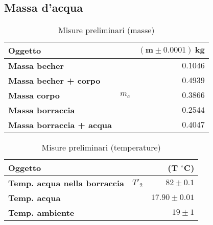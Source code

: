 \documentclass{article}
\begin{document}
	\subsection{Massa d'acqua}
	\begin{minipage}{0.4\textwidth}
		\begin{table}[H] \centering
			\begin{small}
				\begin{tabular}{@{}lrr@{}}\toprule
					\textbf{Oggetto}&  & \(\boldsymbol{(m \pm 0.0001) \SI{}{\kilogram}}\) \\ \midrule
					\textbf{Massa becher}	&	 & \(0.1046\)   \\  \hdashline
					\textbf{Massa becher + corpo}	& 	 & \(0.4939\)   \\  \hdashline
					\textbf{Massa corpo}	& \(m_{c}\)	 & \(0.3866\)   \\  \hdashline
					\textbf{Massa borraccia}	&	 & \(0.2544\)   \\\hdashline
					\textbf{Massa borraccia + acqua}	&	 & \(0.4047\)   \\  
					\bottomrule
				\end{tabular}
			\end{small}
			\caption{Misure preliminari (masse)}
		\end{table}
	\end{minipage}
	\begin{minipage}{0.6\textwidth}
		\begin{table}[H] \centering
			\begin{small}
				\begin{tabular}{@{}lrr@{}}\toprule
					\textbf{Oggetto}					&  			& \textbf{(\(\boldsymbol{T}\)} \(\boldsymbol{^\circ C}\))\\ \midrule
					\textbf{Temp. acqua nella borraccia}	& 	\(T'_{2}\)		& \(82 \pm 0.1\)	 \\  \hdashline
					\textbf{Temp. acqua}				&					&\(17.90 \pm 0.01\)		 	 \\  \hdashline
					\textbf{Temp. ambiente}				&					& \(19 \pm 1\)		 	  \\  
					\bottomrule
				\end{tabular}
			\end{small}
			\caption{Misure preliminari (temperature)}
		\end{table}
	\end{minipage} \\
	\vspace{0.5cm}
	
\end{document}
